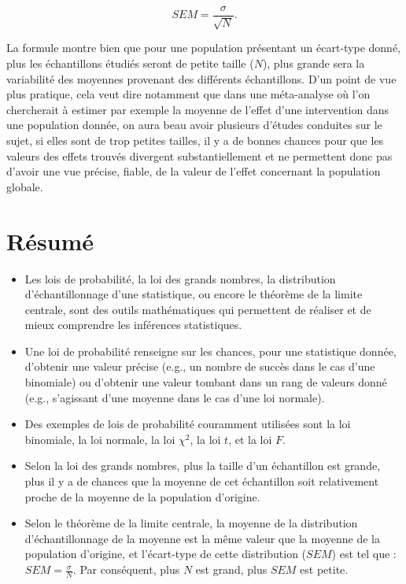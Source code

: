 \documentclass[
  french,
]{book}
\providecommand{\tightlist}{%
  \setlength{\itemsep}{0pt}\setlength{\parskip}{0pt}}
\begin{document}
\[SEM = \frac{\sigma}{\sqrt{N}}.\]

La formule montre bien que pour une population présentant un écart-type donné, plus les échantillons étudiés seront de petite taille (\(N\)), plus grande sera la variabilité des moyennes provenant des différents échantillons. D'un point de vue plus pratique, cela veut dire notamment que dans une méta-analyse où l'on chercherait à estimer par exemple la moyenne de l'effet d'une intervention dans une population donnée, on aura beau avoir plusieurs d'études conduites sur le sujet, si elles sont de trop petites tailles, il y a de bonnes chances pour que les valeurs des effets trouvés divergent substantiellement et ne permettent donc pas d'avoir une vue précise, fiable, de la valeur de l'effet concernant la population globale.

\hypertarget{ruxe9sumuxe9-3}{%
\section{Résumé}\label{ruxe9sumuxe9-3}}

\begin{itemize}
\tightlist
\item
  Les lois de probabilité, la loi des grands nombres, la distribution d'échantillonnage d'une statistique, ou encore le théorème de la limite centrale, sont des outils mathématiques qui permettent de réaliser et de mieux comprendre les inférences statistiques.
\item
  Une loi de probabilité renseigne sur les chances, pour une statistique donnée, d'obtenir une valeur précise (e.g., un nombre de succès dans le cas d'une binomiale) ou d'obtenir une valeur tombant dans un rang de valeurs donné (e.g., s'agissant d'une moyenne dans le cas d'une loi normale).
\item
  Des exemples de lois de probabilité couramment utilisées sont la loi binomiale, la loi normale, la loi \(\chi^2\), la loi \(t\), et la loi \(F\).
\item
  Selon la loi des grands nombres, plus la taille d'un échantillon est grande, plus il y a de chances que la moyenne de cet échantillon soit relativement proche de la moyenne de la population d'origine.
\item
  Selon le théorème de la limite centrale, la moyenne de la distribution d'échantillonnage de la moyenne est la même valeur que la moyenne de la population d'origine, et l'écart-type de cette distribution (\(SEM\)) est tel que : \(SEM = \frac{\sigma}{N}.\) Par conséquent, plus \(N\) est grand, plus \(SEM\) est petite.
\end{itemize}
\end{document}
